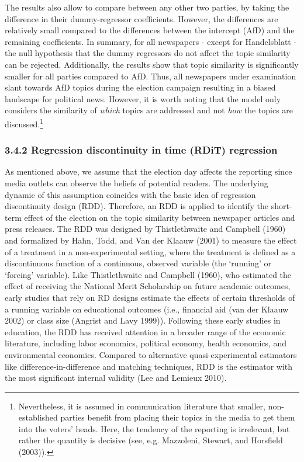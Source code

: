\documentclass[
  12pt,
]{article}
\begin{document}
The results also allow to compare between any other two parties, by
taking the difference in their dummy-regressor coefficients. However,
the differences are relatively small compared to the differences between
the intercept (AfD) and the remaining coefficients. In summary, for all
newspapers - except for Handelsblatt - the null hypothesis that the
dummy regressors do not affect the topic similarity can be rejected.
Additionally, the results show that topic similarity is significantly
smaller for all parties compared to AfD. Thus, all newspapers under
examination slant towards AfD topics during the election campaign
resulting in a biased landscape for political news. However, it is worth
noting that the model only considers the similarity of \emph{which}
topics are addressed and not \emph{how} the topics are
discussed.\footnote{Nevertheless, it is assumed in communication
  literature that smaller, non-established parties benefit from placing
  their topics in the media to get them into the voters' heads. Here,
  the tendency of the reporting is irrelevant, but rather the quantity
  is decisive (see, e.g. Mazzoleni, Stewart, and Horsfield (2003)).}

\hypertarget{rdit}{%
\subsubsection{3.4.2 Regression discontinuity in time (RDiT)
regression}\label{rdit}}

As mentioned above, we assume that the election day affects the
reporting since media outlets can observe the beliefs of potential
readers. The underlying dynamic of this assumption coincides with the
basic idea of regression discontinuity design (RDD). Therefore, an RDD
is applied to identify the short-term effect of the election on the
topic similarity between newspaper articles and press releases. The RDD
was designed by Thistlethwaite and Campbell (1960) and formalized by
Hahn, Todd, and Van der Klaauw (2001) to measure the effect of a
treatment in a non-experimental setting, where the treatment is defined
as a discontinuous function of a continuous, observed variable (the
`running' or `forcing' variable). Like Thistlethwaite and Campbell
(1960), who estimated the effect of receiving the National Merit
Scholarship on future academic outcomes, early studies that rely on RD
designs estimate the effects of certain thresholds of a running variable
on educational outcomes (i.e., financial aid (van der Klaauw 2002) or
class size (Angrist and Lavy 1999)). Following these early studies in
education, the RDD has received attention in a broader range of the
economic literature, including labor economics, political economy,
health economics, and environmental economics. Compared to alternative
quasi-experimental estimators like difference-in-difference and matching
techniques, RDD is the estimator with the most significant internal
validity (Lee and Lemieux 2010).
\end{document}
